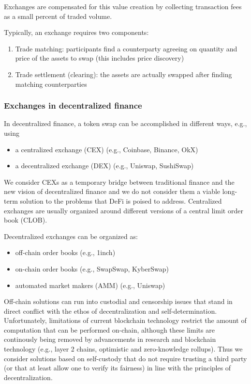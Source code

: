 \documentclass[11pt, reqno]{amsart}
\theoremstyle{definition}
\theoremstyle{remark}
\begin{document}
Exchanges are compensated for this value creation by collecting transaction
fees as a small percent of traded volume.

Typically, an exchange requires two components:
\begin{enumerate}
	\item Trade matching: participants find a counterparty agreeing on quantity
	      and price of the assets to swap (this includes price discovery)
    \item Trade settlement (clearing): the assets are actually swapped after
          finding matching counterparties
\end{enumerate}

\subsubsection{Exchanges in decentralized finance}
In decentralized finance, a token swap can be accomplished in different ways,
e.g., using
\begin{itemize}
	\item a centralized exchange (CEX) (e.g., Coinbase, Binance, OkX)
	\item a decentralized exchange (DEX) (e.g., Uniswap, SushiSwap)
\end{itemize}

We consider CEXs as a temporary bridge between traditional finance and the
new vision of decentralized finance and we do not consider them a viable
long-term solution to the problems that DeFi is poised to address.
Centralized exchanges are usually organized around different versions of a
central limit order book (CLOB).

Decentralized exchanges can be organized as:
\begin{itemize}
	\item off-chain order books (e.g., 1inch)
	\item on-chain order books (e.g., SwapSwap, KyberSwap)
	\item automated market makers (AMM) (e.g., Uniswap)
\end{itemize}

Off-chain solutions can run into custodial and censorship issues that stand
in direct conflict with the ethos of decentralization and self-determination.
Unfortunately, limitations of current blockchain technology restrict
the amount of computation that can be performed on-chain, although these limits
are continously being removed by advancements in research and blockchain
technology (e.g., layer 2 chains, optimistic and zero-knowledge rollups).
Thus we consider solutions based on self-custody that do not require
trusting a third party (or that at least allow one to verify its fairness) in
line with the principles of decentralization.
\end{document}
